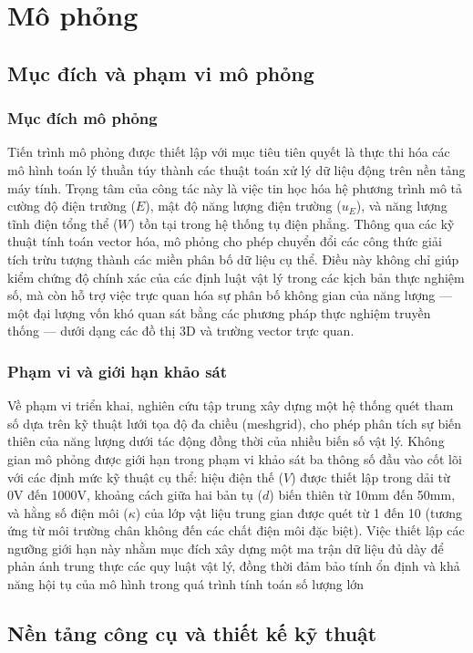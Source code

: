 \section{Mô phỏng}
\subsection{Mục đích và phạm vi mô phỏng}
\subsubsection{Mục đích mô phỏng}
Tiến trình mô phỏng được thiết lập với mục tiêu tiên quyết là thực thi hóa các mô hình toán lý thuần túy thành các thuật toán xử lý dữ liệu động trên nền tảng máy tính. Trọng tâm của công tác này là việc tin học hóa hệ phương trình mô tả cường độ điện trường ($E$), mật độ năng lượng điện trường ($u_E$), và năng lượng tĩnh điện tổng thể ($W$) tồn tại trong hệ thống tụ điện phẳng. Thông qua các kỹ thuật tính toán vector hóa, mô phỏng cho phép chuyển đổi các công thức giải tích trừu tượng thành các miền phân bố dữ liệu cụ thể. Điều này không chỉ giúp kiểm chứng độ chính xác của các định luật vật lý trong các kịch bản thực nghiệm số, mà còn hỗ trợ việc trực quan hóa sự phân bố không gian của năng lượng — một đại lượng vốn khó quan sát bằng các phương pháp thực nghiệm truyền thống — dưới dạng các đồ thị 3D và trường vector trực quan.
\subsubsection{Phạm vi và giới hạn khảo sát}
Về phạm vi triển khai, nghiên cứu tập trung xây dựng một hệ thống quét tham số dựa trên kỹ thuật lưới tọa độ đa chiều (meshgrid), cho phép phân tích sự biến thiên của năng lượng dưới tác động đồng thời của nhiều biến số vật lý. Không gian mô phỏng được giới hạn trong phạm vi khảo sát ba thông số đầu vào cốt lõi với các định mức kỹ thuật cụ thể: hiệu điện thế ($V$) được thiết lập trong dải từ 0V đến 1000V, khoảng cách giữa hai bản tụ ($d$) biến thiên từ 10mm đến 50mm, và hằng số điện môi ($\kappa$) của lớp vật liệu trung gian được quét từ 1 đến 10 (tương ứng từ môi trường chân không đến các chất điện môi đặc biệt). Việc thiết lập các ngưỡng giới hạn này nhằm mục đích xây dựng một ma trận dữ liệu đủ dày để phản ánh trung thực các quy luật vật lý, đồng thời đảm bảo tính ổn định và khả năng hội tụ của mô hình trong quá trình tính toán số lượng lớn

\subsection{Nền tảng công cụ và thiết kế kỹ thuật}
